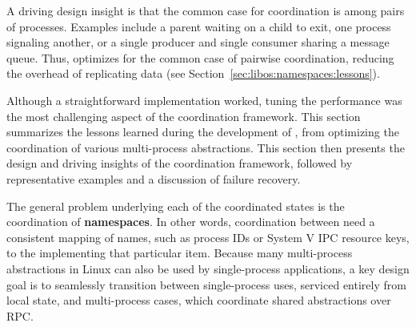 A driving design insight is that the common case
for coordination is among pairs of processes.
Examples include a parent waiting on a child to exit, 
one process signaling another, or a single producer and single consumer
sharing a message queue.
Thus, \graphene{} optimizes for the common case of pairwise coordination,
reducing the overhead of replicating data (see Section~\ref{sec:libos:namespaces:lessons}).



Although a straightforward implementation worked, tuning the performance was the most challenging aspect of the coordination framework. 
This section summarizes the lessons learned during the development of \graphene{}, from optimizing the coordination of various multi-process abstractions.
This section then
presents the design and driving insights of the coordination framework,
followed by representative examples 
and a discussion of failure recovery.

\label{sec:libos:namespaces:building-blocks}

The general problem underlying each of the coordinated \libos{} states is 
the coordination of {\bf namespaces}.  In other words, coordination between \picoprocs{} need 
a consistent mapping of names, such as process IDs or System V IPC resource keys, 
to the \picoproc{} implementing that particular item.  
Because many multi-process abstractions in Linux can also be used by single-process applications,
a key design goal is to seamlessly transition between single-process uses, serviced 
entirely from local \libos{} state, and multi-process cases, which coordinate shared abstractions over RPC.



